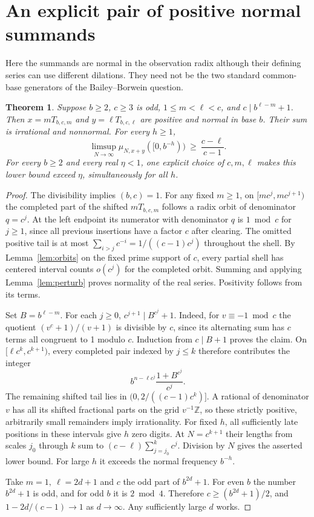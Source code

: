 \documentclass[11pt]{article}
\newtheorem{theorem}{Theorem}
\newcommand{\Z}{\mathbb Z}
\begin{document}
\appendix
\section{An explicit pair of positive normal summands}\label{app:pair}
Here the summands are normal in the observation radix although their defining
series can use different dilations. They need not be the two standard
common-base generators of the Bailey--Borwein question.

\begin{theorem}\label{th:pair}
Suppose \(b\ge2\), \(c\ge3\) is odd, \(1\le m<\ell<c\), and \(c\mid b^{\ell-m}+1\). Then \(x=mT_{b,c,m}\) and \(y=\ell T_{b,c,\ell}\) are positive and normal in base \(b\). Their sum is irrational and nonnormal. For every \(h\ge1\),
\[
 \limsup_{N\to\infty}\mu_{N,x+y}([0,b^{-h}))\ \ge\ \frac{c-\ell}{c-1}.
\]
For every \(b\ge2\) and every real \(\eta<1\), one explicit choice of \(c,m,\ell\) makes this lower bound exceed \(\eta\), simultaneously for all \(h\).
\end{theorem}
\begin{proof}
The divisibility implies \((b,c)=1\). For any fixed \(m\ge1\), on \([mc^j,mc^{j+1})\) the completed part of the shifted \(mT_{b,c,m}\) follows a radix orbit of denominator \(q=c^j\). At the left endpoint its numerator with denominator \(q\) is \(1\bmod c\) for \(j\ge1\), since all previous insertions have a factor \(c\) after clearing. The omitted positive tail is at most \(\sum_{i>j}c^{-i}=1/((c-1)c^j)\) throughout the shell. By Lemma~\ref{lem:orbits} on the fixed prime support of \(c\), every partial shell has centered interval counts \(o(c^j)\) for the completed orbit. Summing and applying Lemma~\ref{lem:perturb} proves normality of the real series. Positivity follows from its terms.

Set \(B=b^{\ell-m}\). For each \(j\ge0\), \(c^{j+1}\mid B^{c^j}+1\). Indeed, for \(v\equiv-1\bmod c\) the quotient \((v^c+1)/(v+1)\) is divisible by \(c\), since its alternating sum has \(c\) terms all congruent to 1 modulo \(c\). Induction from \(c\mid B+1\) proves the claim. On \([\ell c^k,c^{k+1})\), every completed pair indexed by \(j\le k\) therefore contributes the integer
\[
 b^{n-\ell c^j}\frac{1+B^{c^j}}{c^j}.
\]
The remaining shifted tail lies in \((0,2/((c-1)c^k)]\). A rational of denominator \(v\) has all its shifted fractional parts on the grid \(v^{-1}\Z\), so these strictly positive, arbitrarily small remainders imply irrationality. For fixed \(h\), all sufficiently late positions in these intervals give \(h\) zero digits. At \(N=c^{k+1}\) their lengths from scales \(j_0\) through \(k\) sum to \((c-\ell)\sum_{j=j_0}^k c^j\). Division by \(N\) gives the asserted lower bound. For large \(h\) it exceeds the normal frequency \(b^{-h}\).

Take \(m=1,\ \ell=2d+1\) and \(c\) the odd part of \(b^{2d}+1\). For even \(b\) the number \(b^{2d}+1\) is odd, and for odd \(b\) it is \(2\bmod 4\). Therefore \(c\ge(b^{2d}+1)/2\), and \(1-2d/(c-1)\to1\) as \(d\to\infty\). Any sufficiently large \(d\) works.
\end{proof}
\end{document}
